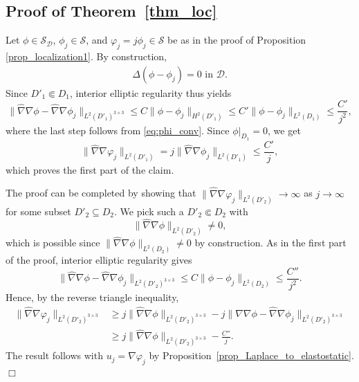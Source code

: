 \documentclass[reqno]{amsart}
\numberwithin{equation}{section}
\numberwithin{figure}{section}
\numberwithin{table}{section}
\newcommand{\norm}[1]{\lVert#1\rVert}
\newcommand{\D}{\mathcal{D}}
\theoremstyle{definition}
\theoremstyle{plain}
\theoremstyle{definition}
\theoremstyle{remark}
\numberwithin{equation}{section}
\begin{document}
\subsection{Proof of Theorem~\ref{thm_loc}} \label{sec:proofthmloc}

Let $\phi \in \mathcal{S}_{\D}$, $\phi_j \in \mathcal{S}$, and $\varphi_j = j \phi_j \in \mathcal{S}$ be as in the proof of Proposition \ref{prop_localization1}. By construction,
%
\begin{align*}
	\Delta (\phi - \phi_j) = 0 \text{ in } \D.
\end{align*}
%
Since $D'_1 \Subset D_1$, interior elliptic regularity thus yields
%
\begin{equation*}
	\norm{\widehat{\nabla}\nabla\phi -\widehat{\nabla}\nabla\phi_j}_{L^2(D'_1)^{3 \times 3}} \leq C \norm{\phi - \phi_j}_{H^2(D'_1)} \leq C' \norm{\phi-\phi_j}_{L^2(D_1)} \leq  \frac{C'}{j^2},
\end{equation*} 
%
where the last step follows from \eqref{eq:phi_conv}. Since $\phi|_{D_1} = 0$, we get
%
\begin{equation*}
	\norm{\widehat{\nabla} \nabla \varphi_j}_{L^2(D'_1)} = j \norm{\widehat{\nabla} \nabla \phi_j}_{L^2(D'_1)} \leq \frac{C'}{j},
\end{equation*}
%
which proves the first part of the claim.

The proof can be completed by showing that $\norm{\widehat{\nabla}\nabla\varphi_j}_{L^2(D'_2)} \to \infty$ as $j \to \infty$ for some subset $D'_2 \subseteq D_2$. We pick such a $D'_2 \Subset D_2$ with 
%
\begin{equation*}
	\norm{\widehat{\nabla}\nabla\phi}_{L^2(D'_2)} \neq 0,
\end{equation*}
%
which is possible since $\norm{\widehat{\nabla}\nabla\phi}_{L^2(D_2)} \neq 0$ by construction. As in the first part of the proof, interior elliptic regularity gives
%
\begin{equation*}
	\norm{\widehat{\nabla}\nabla\phi - \widehat{\nabla}\nabla\phi_j}_{L^2(D'_2)^{3 \times 3}} \leq C \norm{\phi - \phi_j}_{L^2(D_2)} \leq \frac{C''}{j^2}.
\end{equation*}
%
Hence, by the reverse triangle inequality,
%
\begin{align*}
	\norm{\widehat{\nabla}\nabla\varphi_j} _{L^2(D'_2)^{3 \times 3}} &\geq j \norm{\widehat{\nabla}\nabla\phi}_{L^2(D'_2)^{3 \times 3}} - j \norm{\widehat{\nabla}\nabla\phi - \widehat{\nabla}\nabla\phi_j}_{L^2(D'_2)^{3 \times 3}} \\ 
	&\geq   j \norm{\widehat{\nabla}\nabla\phi}_{L^2(D'_2)^{3 \times 3}} - \frac{C''}{j}.
\end{align*}
%
The result follows with $u_j = \nabla\varphi_j$ by Proposition~\ref{prop_Laplace_to_elastostatic}. \hfill $\Box$
	
\end{document}
